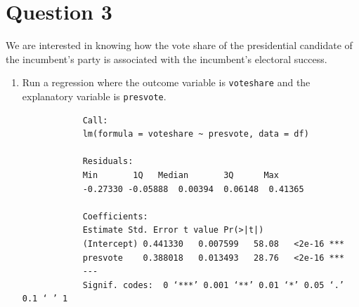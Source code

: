 \documentclass[12pt,letterpaper]{article}
\begin{document}
	\newpage	
\section*{Question 3}

\noindent We are interested in knowing how the vote share of the presidential candidate of the incumbent's party is associated with the incumbent's electoral success.
	\vspace{.25cm}
	\begin{enumerate}
		\item Run a regression where the outcome variable is \texttt{voteshare} and the explanatory variable is \texttt{presvote}.
			 
				\begin{verbatim}
			Call:
			lm(formula = voteshare ~ presvote, data = df)
			
			Residuals:
			Min       1Q   Median       3Q      Max 
			-0.27330 -0.05888  0.00394  0.06148  0.41365 
			
			Coefficients:
			Estimate Std. Error t value Pr(>|t|)    
			(Intercept) 0.441330   0.007599   58.08   <2e-16 ***
			presvote    0.388018   0.013493   28.76   <2e-16 ***
			---
			Signif. codes:  0 ‘***’ 0.001 ‘**’ 0.01 ‘*’ 0.05 ‘.’ 0.1 ‘ ’ 1
			

\end{verbatim}
\end{enumerate}
\end{document}
